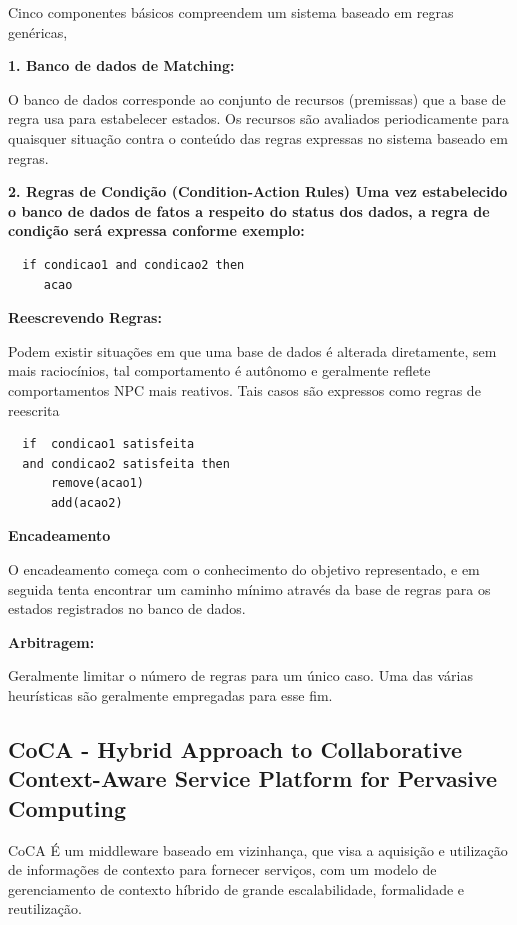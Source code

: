\documentclass[12pt,a4paper,compsoc]{IEEEtran}
\begin{document}
  Cinco componentes básicos compreendem um sistema baseado em regras genéricas,

  \textbf{1. Banco de dados de Matching:}

  O banco de dados corresponde ao conjunto de recursos (premissas) que a base de regra usa para
  estabelecer estados. Os recursos são avaliados periodicamente para quaisquer situação contra o
  conteúdo das regras expressas no sistema baseado em regras.

  \textbf{2. Regras de Condição (Condition-Action Rules) Uma vez estabelecido o banco de dados de
  fatos a respeito do status dos dados, a regra de condição será expressa conforme exemplo:}

  \begin{lstlisting}
  if condicao1 and condicao2 then
     acao
  \end{lstlisting}

  \textbf{Reescrevendo Regras:}

  Podem existir situações em que uma base de dados é alterada diretamente, sem mais raciocínios,
  tal comportamento é autônomo e geralmente reflete comportamentos NPC mais reativos. Tais casos
  são expressos como regras de reescrita 

  \begin{lstlisting}
  if  condicao1 satisfeita
  and condicao2 satisfeita then
      remove(acao1)
      add(acao2)
  \end{lstlisting}

  \textbf{Encadeamento}
  
  O encadeamento  começa com o conhecimento do objetivo  representado, e em seguida tenta encontrar
  um caminho mínimo através da base de regras para os estados registrados no banco de dados.
  
  \textbf{Arbitragem:}
  
  Geralmente limitar o número de regras para um único caso. Uma das várias heurísticas são 
  geralmente empregadas para esse fim.


\subsection{CoCA - Hybrid Approach to Collaborative Context-Aware Service Platform for Pervasive
 Computing}

  CoCA É um middleware baseado em vizinhança, que visa a aquisição e utilização de informações de
  contexto para fornecer serviços, com um modelo de gerenciamento de contexto híbrido de grande
  escalabilidade, formalidade e reutilização.
  
\end{document}
